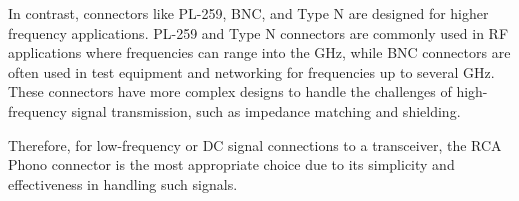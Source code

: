 In contrast, connectors like PL-259, BNC, and Type N are designed for higher frequency applications. PL-259 and Type N connectors are commonly used in RF applications where frequencies can range into the GHz, while BNC connectors are often used in test equipment and networking for frequencies up to several GHz. These connectors have more complex designs to handle the challenges of high-frequency signal transmission, such as impedance matching and shielding.

Therefore, for low-frequency or DC signal connections to a transceiver, the RCA Phono connector is the most appropriate choice due to its simplicity and effectiveness in handling such signals.

